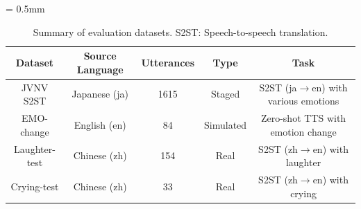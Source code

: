 \begin{table}[t]
\centering
\caption{Summary of evaluation datasets. S2ST: Speech-to-speech translation.}
\label{table:eval_datasets}
\resizebox{0.48\textwidth}{!}
{
\centering
 \tabcolsep = 0.5mm
    \begin{tabular}{@{}ccccc@{}}
    \toprule
    \textbf{Dataset} & \textbf{Source Language} & \textbf{Utterances} & \textbf{Type} & \textbf{Task} \\ 
    \midrule
    JVNV S2ST & Japanese (ja) & 1615 & Staged & S2ST (ja$\rightarrow$en) with various emotions \\ 
    EMO-change & English (en) & 84 & Simulated & Zero-shot TTS with emotion change \\ %
    Laughter-test & Chinese (zh) & 154 & Real & S2ST (zh$\rightarrow$en) with laughter\\ 
    Crying-test & Chinese (zh) & 33 & Real & S2ST (zh$\rightarrow$en) with crying \\ \bottomrule
    \end{tabular}
}
\vspace{-3mm}
\end{table}